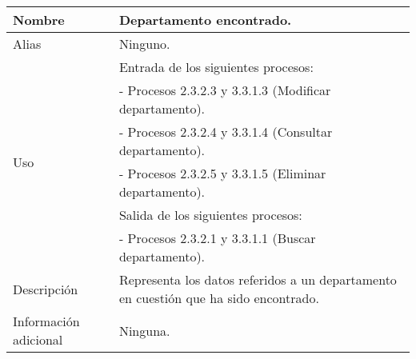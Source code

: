 \begin{center}
  \begin{tabular}{| l | p{9cm} |}
    \hline
    Nombre & \textbf{Departamento encontrado}.\\
    \hline
    Alias & Ninguno.\\
    \hline
    \multirow{6}{*}{Uso} & Entrada de los siguientes procesos:\\
                         & - Procesos 2.3.2.3 y 3.3.1.3 (Modificar departamento).\\
                         & - Procesos 2.3.2.4 y 3.3.1.4 (Consultar departamento).\\
                         & - Procesos 2.3.2.5 y 3.3.1.5 (Eliminar departamento).\\
                         & Salida de los siguientes procesos:\\
                         & - Procesos 2.3.2.1 y 3.3.1.1 (Buscar departamento).\\
    \hline
    Descripción & Representa los datos referidos a un departamento en cuestión
                  que ha sido encontrado.\\
    \hline
    Información adicional & Ninguna.\\
    \hline
  \end{tabular}
\end{center}
